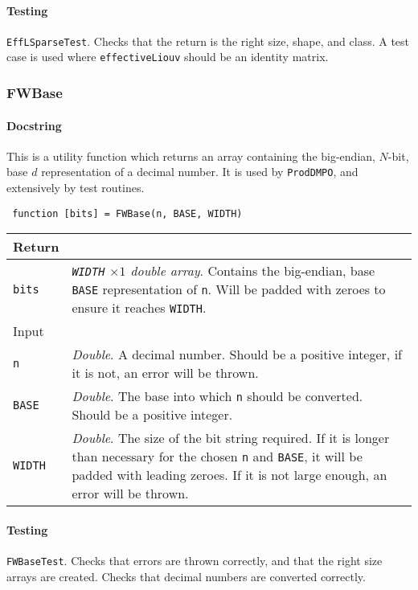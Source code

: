  \paragraph{Testing} \lstinline$EffLSparseTest$. Checks that the return is the right size, shape, and class. A test case is used where \lstinline$effectiveLiouv$ should be an identity matrix. 
 
 \subsubsection{FWBase}
 \paragraph{Docstring} This is a utility function which returns an array containing the big-endian, \(N\)-bit, base \(d\) representation of a decimal number. It is used by \lstinline$ProdDMPO$, and extensively by test routines. 
 \begin{lstlisting}
 function [bits] = FWBase(n, BASE, WIDTH) \end{lstlisting}
 \begin{longtabu}{X[1,l]X[4,l]}
 \hline
 Return & \\ \hline
 \lstinline$bits$ & \emph{\lstinline$WIDTH$ \(\times 1\) double array}. Contains the big-endian, base \lstinline$BASE$ representation of \lstinline$n$. Will be padded with zeroes to ensure it reaches \lstinline$WIDTH$. \\ \hline
 Input & \\ \hline
 \lstinline$n$ & \emph{Double}. A decimal number. Should be a positive integer, if it is not, an error will be thrown. \\
 \lstinline$BASE$ & \emph{Double}. The base into which \lstinline$n$ should be converted. Should be a positive integer. \\
 \lstinline$WIDTH$ & \emph{Double}. The size of the bit string required. If it is longer than necessary for the chosen \lstinline$n$ and \lstinline$BASE$, it will be padded with leading zeroes. If it is not large enough, an error will be thrown. \\
 \hline
 \end{longtabu}
 \paragraph{Testing} \lstinline$FWBaseTest$. Checks that errors are thrown correctly, and that the right size arrays are created. Checks that decimal numbers are converted correctly.

